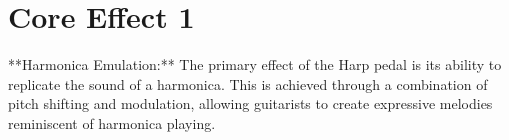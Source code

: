 \chapter{Core Effect 1}

**Harmonica Emulation:**  
The primary effect of the Harp pedal is its ability to replicate the sound of a harmonica. This is achieved through a combination of pitch shifting and modulation, allowing guitarists to create expressive melodies reminiscent of harmonica playing.
